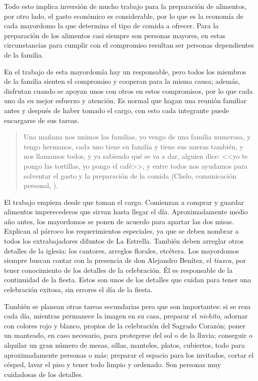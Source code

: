 \documentclass[14pt,letterpaper,twoside]{extbook} %
\begin{document}
Todo esto implica inversión de mucho trabajo para la preparación de alimentos, por otro lado, el gasto económico es considerable, por lo que es la economía de cada mayordomo la que determina el tipo de comida a ofrecer. Para la preparación de los alimentos casi siempre son personas mayores, en estas circunstancias para cumplir con el compromiso resultan ser personas dependientes de la familia.

En el trabajo de esta mayordomía hay un responsable, pero todos los miembros de la familia sienten el compromiso y cooperan para la misma causa; además, disfrutan cuando se apoyan unos con otros en estos compromisos, por lo que cada uno da su mejor esfuerzo y atención. Es normal que hagan una reunión familiar antes y después de haber tomado el cargo, con esto cada integrante puede encargarse de sus tareas.

\begin{quotation}
\noindent Una mañana nos unimos las familias, yo vengo de una familia numerosa, y tengo  hermanos, cada uno tiene su familia y tiene sus nueras también, y nos llamamos todos, y ya sabiendo qué se va a dar, alguien dice: <<yo te pongo las tortillas, yo pongo el café>>, y entre todos nos ayudamos para solventar el gasto y la preparación de la comida (Chelo, comunicación personal, ).
\end{quotation}

\noindent El trabajo empieza desde que toman el cargo. Comienzan a comprar y guardar alimentos imperecederos que sirvan hasta llegar el día. Aproximadamente medio año antes, los mayordomos se ponen de acuerdo para apartar las dos misas. Explican al párroco los requerimientos especiales, ya que se deben nombrar a todos los extrabajadores difuntos de La Estrella. También deben arreglar otros detalles de la iglesia: los cantores, arreglos florales, etcétera. Los mayordomos siempre buscan contar con la presencia de don Alejandro Benítez, el \textit{tiaxca}, por tener conocimiento de los detalles de la celebración. Él es responsable de la continuidad de la fiesta. Estos son unos de los detalles que cuidan para tener una celebración exitosa, sin errores el día de la fiesta.

También se planean otras tareas secundarias pero que son importantes: si se reza cada día, mientras permanece la imagen en su casa, preparar el \textit{nichito}, adornar con colores rojo y blanco, propios de la celebración del Sagrado Corazón; poner un manteado, en caso necesario, para protegerse del sol o de la lluvia; conseguir o alquilar un gran número de mesas, sillas, manteles, platos, cubiertos, todo para aproximadamente  personas o más; preparar el espacio para los invitados, cortar el césped, lavar el piso y tener todo limpio y ordenado. Son personas muy cuidadosas de los detalles.
\end{document}
